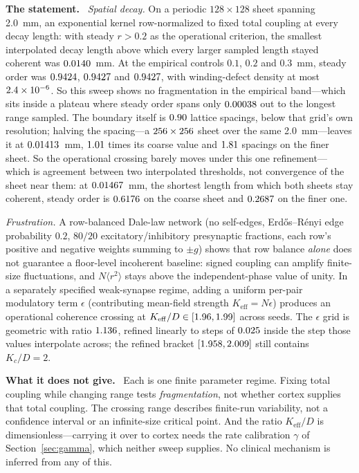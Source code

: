 \documentclass[11pt]{article}
\newcommand{\statement}{\par\smallskip\noindent\textbf{The statement.}\ }
\newcommand{\scope}{\par\smallskip\noindent\textbf{What it does not give.}\ }
\newcommand{\Kc}{K_{c}}
\newcommand{\Keff}{K_{\mathrm{eff}}}
\begin{document}
\statement
\emph{Spatial decay.} On a periodic $128\times128$ sheet spanning 2.0~mm, an
exponential kernel row-normalized to fixed total coupling at every decay
length: with steady $r>0.2$ as the operational criterion, the smallest
interpolated decay length above which every larger sampled length stayed
coherent was $0.0140$~mm. At the empirical controls $0.1$,
$0.2$ and $0.3$~mm, steady order was $0.9424$, $0.9427$ and
$0.9427$, with winding-defect density at most
$2.4\times10^{-6}$. So this sweep shows no fragmentation in the empirical
band---which sits inside a plateau where steady order spans only
$0.00038$ out to the longest range sampled. The boundary itself
is $0.90$ lattice spacings, below that grid's own
resolution; halving the spacing---a $256\times
256$ sheet over the same 2.0~mm---leaves it at
$0.01413$~mm, $1.01$ times its
coarse value and $1.81$ spacings on the finer
sheet. So the operational crossing barely moves under this one refinement---
which is agreement between two interpolated thresholds, not convergence of the
sheet near them: at $0.01467$~mm, the shortest length from
which both sheets stay coherent, steady order is $0.6176$ on
the coarse sheet and $0.2687$ on the finer one.

\emph{Frustration.} A row-balanced Dale-law network (no self-edges,
Erd\H{o}s--R\'enyi edge probability $0.2$, $80/20$ excitatory/inhibitory
presynaptic fractions, each row's positive and negative weights summing to
$\pm g$) shows that row balance \emph{alone} does not guarantee a floor-level
incoherent baseline: signed coupling can amplify finite-size fluctuations, and
$N\langle r^2\rangle$ stays above the independent-phase value of unity. In a
separately specified weak-synapse regime, adding a uniform per-pair modulatory
term $\epsilon$ (contributing mean-field strength $\Keff=N\epsilon$) produces
an operational coherence crossing at
$\Keff/D\in[\frustrationCouplingMin,\frustrationCouplingMax]$ across seeds.
The $\epsilon$ grid is geometric with ratio $1.136$, refined
linearly to steps of $0.025$ inside the step those values
interpolate across; the refined bracket
$[1.958,2.009]$ still contains $\Kc/D=2$.

\scope
Each is one finite parameter regime. Fixing total coupling while changing
range tests \emph{fragmentation}, not whether cortex supplies that total
coupling. The crossing range describes finite-run variability, not a
confidence interval or an infinite-size critical point. And the ratio
$\Keff/D$ is dimensionless---carrying it over to cortex needs the rate
calibration $\gamma$ of Section~\ref{sec:gamma}, which neither sweep supplies. No clinical
mechanism is inferred from any of this.
\end{document}
